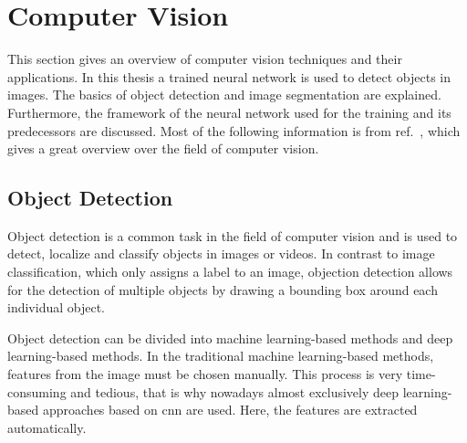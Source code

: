 \section{Computer Vision}
\label{sec:computer_vision}
This section gives an overview of computer vision techniques and their applications.
In this thesis a trained neural network is used to detect objects in images.
The basics of object detection and image segmentation are explained.
Furthermore, the framework of the neural network used for the training and its predecessors are discussed.
Most of the following information is from ref.~\cite{Szeliski2022}, which gives a great overview over the field of computer vision.


\subsection{Object Detection}
Object detection is a common task in the field of computer vision and is used to detect, localize and classify objects in images or videos.
In contrast to image classification, which only assigns a label to an image, objection detection allows for the detection of multiple objects by drawing a bounding box around each individual object.\par
Object detection can be divided into machine learning-based methods and deep learning-based methods.
In the traditional machine learning-based methods, features from the image must be chosen manually.
This process is very time-consuming and tedious, that is why nowadays almost exclusively deep learning-based approaches based on \gls{cnn} are used.
Here, the features are extracted automatically.



